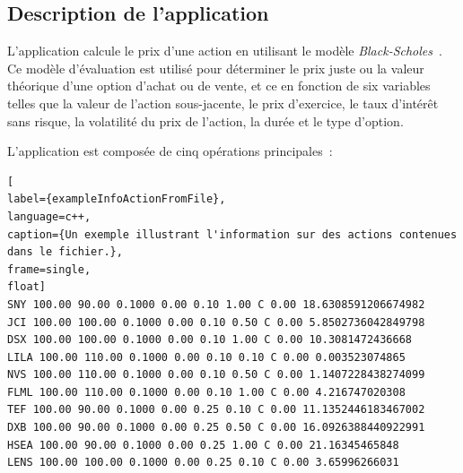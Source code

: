 \subsection{Description de l'application}

L'application  calcule le prix d'une action en utilisant le modèle \emph{Black-Scholes}~\citep{macbeth1979empirical}. Ce mod\`ele d'\'evaluation est utilis\'e pour d\'eterminer le prix juste ou la valeur th\'eorique d'une option d'achat ou de vente, et ce en fonction de six variables telles que la valeur de l'action sous-jacente, le prix d'exercice, le taux d'int\'er\^et sans risque, la volatilit\'e du prix de l'action, la dur\'ee et le type d'option. 

L'application  est compos\'ee de cinq op\'erations principales~: 

\begin{lstlisting}[
label={exampleInfoActionFromFile},
language=c++,
caption={Un exemple illustrant l'information sur des actions contenues dans le fichier.},
frame=single,
float]
SNY 100.00 90.00 0.1000 0.00 0.10 1.00 C 0.00 18.6308591206674982
JCI 100.00 100.00 0.1000 0.00 0.10 0.50 C 0.00 5.8502736042849798
DSX 100.00 100.00 0.1000 0.00 0.10 1.00 C 0.00 10.3081472436668
LILA 100.00 110.00 0.1000 0.00 0.10 0.10 C 0.00 0.003523074865
NVS 100.00 110.00 0.1000 0.00 0.10 0.50 C 0.00 1.1407228438274099
FLML 100.00 110.00 0.1000 0.00 0.10 1.00 C 0.00 4.216747020308
TEF 100.00 90.00 0.1000 0.00 0.25 0.10 C 0.00 11.1352446183467002
DXB 100.00 90.00 0.1000 0.00 0.25 0.50 C 0.00 16.0926388440922991
HSEA 100.00 90.00 0.1000 0.00 0.25 1.00 C 0.00 21.16345465848
LENS 100.00 100.00 0.1000 0.00 0.25 0.10 C 0.00 3.65996266031
\end{lstlisting}

